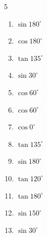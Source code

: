 \begin{multicols}{5}
\begin{enumerate}

  \item $\displaystyle \sin{180^\circ}$

        \phantom{$\displaystyle =0$}

  \item $\displaystyle \cos{180^\circ}$

        \phantom{$\displaystyle =-1$}

  \item $\displaystyle \tan{135^\circ}$

        \phantom{$\displaystyle =-1$}

  \item $\displaystyle \sin{30^\circ}$


  \item $\displaystyle \cos{60^\circ}$


  \item $\displaystyle \cos{60^\circ}$


  \item $\displaystyle \cos{0^\circ}$

        \phantom{$\displaystyle =1$}

\columnbreak %

  \item $\displaystyle \tan{135^\circ}$

        \phantom{$\displaystyle =-1$}

  \item $\displaystyle \sin{180^\circ}$

        \phantom{$\displaystyle =0$}

  \item $\displaystyle \tan{120^\circ}$


  \item $\displaystyle \tan{180^\circ}$

        \phantom{$\displaystyle =0$}

  \item $\displaystyle \sin{150^\circ}$


  \item $\displaystyle \sin{30^\circ}$


\end{enumerate}
\end{multicols}
